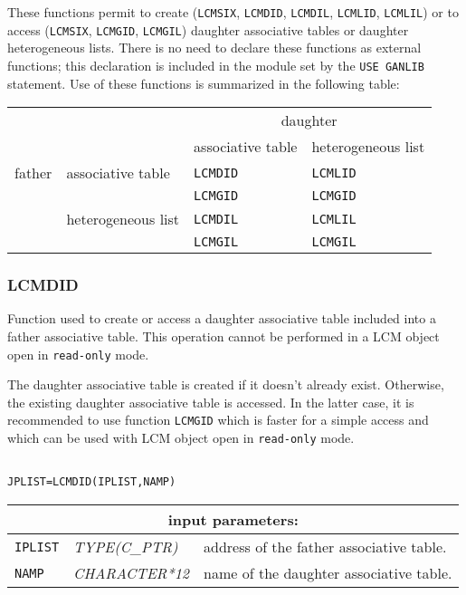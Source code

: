 These functions permit to create ({\tt LCMSIX}, {\tt LCMDID}, {\tt LCMDIL},
{\tt LCMLID}, {\tt LCMLIL}) or to access ({\tt LCMSIX}, {\tt LCMGID}, {\tt LCMGIL})
daughter associative tables or daughter heterogeneous lists. There is no need to 
declare these functions as external functions; this declaration is included in the module set by the {\tt USE GANLIB} statement. Use of these functions is summarized in the following table:

\begin{center}
\begin{tabular}{|c|l|l|l|}
\cline{3-4}
\multicolumn{2}{c|}{} & \multicolumn{2}{c|}{daughter} \\
\cline{3-4}
\multicolumn{2}{c|}{} & associative table & heterogeneous list \\
\hline
father & associative table & {\tt LCMDID} & {\tt LCMLID} \\
       &                   & {\tt LCMGID} & {\tt LCMGID} \\
\cline{2-4}
       & heterogeneous list & {\tt LCMDIL} & {\tt LCMLIL} \\
       &                   & {\tt LCMGIL} & {\tt LCMGIL} \\
\hline
\end{tabular}
\end{center}

\subsubsection{LCMDID}

Function used to create or access a daughter associative table included into a father associative table. This operation cannot be
performed in a LCM object open in {\tt read-only} mode.

\vskip 0.2cm

The daughter associative table is created if it doesn't already exist. Otherwise, the
existing daughter associative table is accessed. In the latter case, it is recommended
to use function {\tt LCMGID} which is faster for a simple access and which can be used
with LCM object open in {\tt read-only} mode.

\begin{verbatim}

JPLIST=LCMDID(IPLIST,NAMP)
\end{verbatim}

\noindent
\begin{tabular}{|p{1.5cm}|p{3cm}|p{10cm}|}
\hline
\multicolumn{3}{|c|}{\bf input parameters:} \\
\hline
{\tt IPLIST} & {\it TYPE(C\_PTR)} & address of the father associative table. \\
\hline
{\tt NAMP} & {\it CHARACTER*12} & name of the daughter associative table. \\
\hline
\end{tabular}

